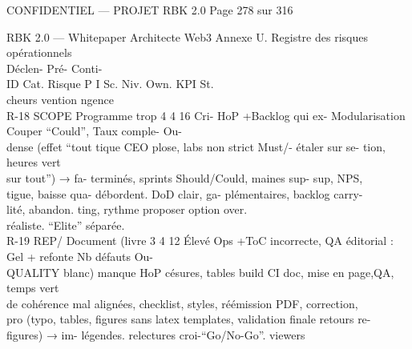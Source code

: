 \vspace{0.5em}
\begin{confidential}CONFIDENTIEL — PROJET RBK 2.0                                                                                                Page 278 sur 316\end{confidential}
RBK 2.0 — Whitepaper Architecte Web3                                                                                                           Annexe U. Registre des risques opérationnels\\
\vspace{0.5em}
\vspace{0.5em}
Déclen-           Pré-             Conti-\\
ID     Cat.      Risque            P I Sc. Niv. Own.                                                             KPI            St.\\
cheurs            vention          ngence\\
R-18   SCOPE     Programme trop 4 4 16 Cri- HoP           +Backlog qui ex- Modularisation Couper “Could”, Taux comple- Ou-\\
dense (effet “tout    tique CEO           plose, labs non strict       Must/- étaler sur se- tion, heures vert\\
sur tout”) → fa-                          terminés, sprints Should/Could, maines           sup- sup,     NPS,\\
tigue, baisse qua-                        débordent.        DoD clair, ga- plémentaires,        backlog carry-\\
lité, abandon.                                              ting,     rythme proposer option over.\\
réaliste.        “Elite” séparée.\\
R-19   REP/    Document (livre 3 4 12 Élevé Ops           +ToC incorrecte, QA éditorial : Gel + refonte Nb             défauts Ou-\\
QUALITY blanc) manque                HoP            césures, tables build CI doc, mise en page,QA,               temps vert\\
de      cohérence                           mal     alignées, checklist, styles, réémission PDF, correction,\\
pro (typo, tables,                          figures     sans latex templates, validation finale retours      re-\\
figures) → im-                              légendes.         relectures croi-“Go/No-Go”.        viewers\\
